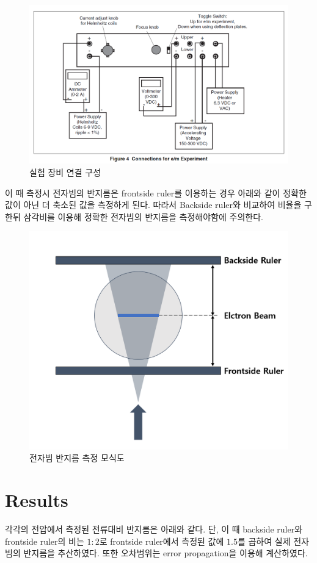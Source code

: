 \documentclass[%
 reprint,
 amsmath,amssymb,
 aps,
]{revtex4-2}
\begin{document}
\begin{figure}[htbp]
	\includegraphics[width = 0.95\linewidth]{PASCO.png}%
	\caption{\label{fig:PASCO}실험 장비 연결 구성}
\end{figure}

이 때 측정시 전자빔의 반지름은 frontside ruler를 이용하는 경우 아래와 같이 정확한 값이 아닌 더 축소된 값을 측정하게 된다. 따라서 Backside ruler와 비교하여 비율을 구한뒤 삼각비를 이용해 정확한 전자빔의 반지름을 측정해야함에 주의한다.

\begin{figure}[htbp]
	\includegraphics[width = 0.95\linewidth]{MEAS.png}%
	\caption{\label{fig:MEAS}전자빔 반지름 측정 모식도}
\end{figure}

\section{\label{sec:level1}Results}
각각의 전압에서 측정된 전류대비 반지름은 아래와 같다. 단, 이 때 backside ruler와 frontside ruler의 비는 $1:2$로 frontside ruler에서 측정된 값에 $1.5$를 곱하여 실제 전자빔의 반지름을 추산하였다. 또한 오차범위는 error propagation을 이용해 계산하였다.
\end{document}
